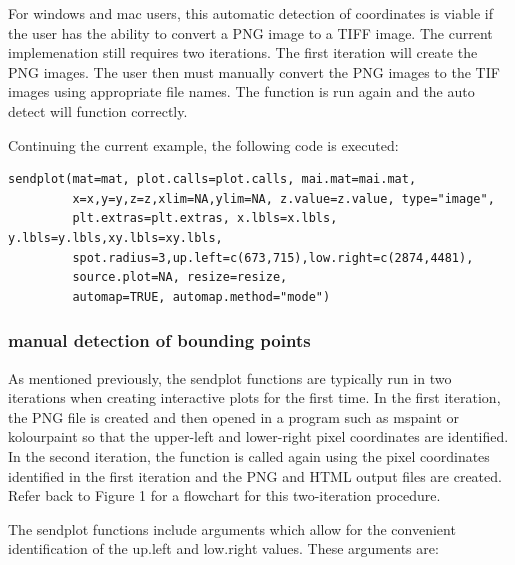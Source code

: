 \documentclass[]{article}
\begin{document}
\indent For windows and mac users, this automatic detection of coordinates is viable if the user has the ability to convert a PNG image to a TIFF image. The current implemenation still requires two iterations. The first iteration will create the PNG images. The user then must manually convert the PNG images to the TIF images using appropriate file names. The function is run again and the auto detect will function correctly.  

\indent Continuing the current example, the following code is executed:
\begin{verbatim}
sendplot(mat=mat, plot.calls=plot.calls, mai.mat=mai.mat,
         x=x,y=y,z=z,xlim=NA,ylim=NA, z.value=z.value, type="image",
         plt.extras=plt.extras, x.lbls=x.lbls, y.lbls=y.lbls,xy.lbls=xy.lbls, 
         spot.radius=3,up.left=c(673,715),low.right=c(2874,4481),
         source.plot=NA, resize=resize,
         automap=TRUE, automap.method="mode")
\end{verbatim}


\subsubsection{manual detection of bounding points}

\indent As mentioned previously, the sendplot functions are typically run in two iterations when creating interactive plots for the first time. In the first iteration, the PNG file is created and then opened in a program such as mspaint or kolourpaint so that the upper-left and lower-right pixel coordinates are identified. In the second iteration, the function is called again using the pixel coordinates identified in the first iteration and the PNG and HTML output files are created.  Refer back to Figure 1 for a flowchart for this two-iteration procedure. 


\indent The sendplot functions  include arguments which allow for the convenient identification of the up.left and low.right values. These arguments are:
\end{document}
